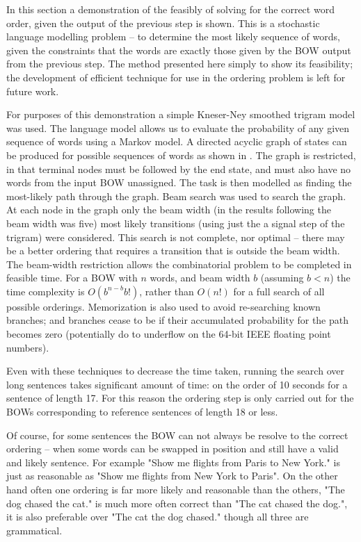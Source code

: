 \documentclass[]{scrartcl}
\numberwithin{equation}{section}
\numberwithin{figure}{section}
\theoremstyle{plain}
\theoremstyle{definition}
\begin{document}
In this section a demonstration of the feasibly of solving for the correct word order, given the output of the previous step is shown. This is a stochastic language modelling problem -- to determine the most likely sequence of words, given the constraints that the words are exactly those given by the BOW output from the previous step. The method presented here simply to show its feasibility; the development of efficient technique for use in the ordering problem is left for future work.


For purposes of this demonstration a simple Kneser-Ney smoothed trigram model \parencite{kneser1995improved} was used. The language model allows us to evaluate the probability of any given sequence of words using a Markov model.
A directed acyclic graph of states can be produced for possible sequences of words as shown in . The graph is restricted, in that terminal nodes must be followed by the end state, and must also have no words from the input BOW unassigned. The task is then modelled as finding the most-likely path through the graph.
Beam search was used to search the graph. At each node in the graph only the beam width (in the results following the beam width was five) most likely transitions (using just the a signal step of the trigram) were considered. This search is not complete, nor optimal -- there may be a better ordering that requires a transition that is outside the beam width. The beam-width restriction allows the combinatorial problem to be completed in feasible time. For a BOW with $n$ words, and beam width $b$ (assuming $b<n$) the time complexity is $O(b^{n-b}b!)$, rather than $O(n!)$ for a full search of all possible orderings. Memorization is also used to avoid re-searching known branches; and branches cease to be  if their accumulated probability for the path becomes zero (potentially do to underflow on the 64-bit IEEE floating point numbers).

Even with these techniques to decrease the time taken, running the search over long sentences takes significant amount of time: on the order of 10 seconds for a sentence of length 17. For this reason the ordering step is only carried out for the BOWs corresponding to reference sentences of length 18 or less. 
 
 
Of course, for some sentences the BOW can not always be resolve to the correct ordering -- when some words can be swapped in position and still have a valid and likely sentence. For example "Show me flights from Paris to New York." is just as reasonable as  "Show me flights from New York to Paris". On the other hand often one ordering is far more likely and reasonable than the others, "The dog chased the cat." is much more often correct than "The cat chased the dog.", it is also preferable over "The cat the dog chased." though all three are grammatical. 
  
\end{document}
